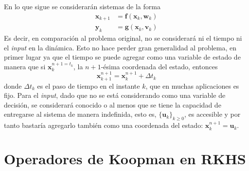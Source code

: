 En lo que sigue se considerarán sistemas de la forma
\begin{align*}
	\mathbf{x}_{k+1} &= \mathbf{f}( \mathbf{x}_k, \mathbf{w}_k) \\
	\mathbf{y}_k &= \mathbf{g}(\mathbf{x}_k, \mathbf{v}_k)
\end{align*}
Es decir, en comparación al problema original, no se considerará ni el tiempo ni el \textit{input} en la dinámica. Esto no hace perder gran generalidad al problema, en primer lugar ya que el tiempo se puede agregar como una variable de estado de manera que si $\mathbf{x}_{k}^{n+1 = t_k}$, la $n+1$-ésima coordenada del estado, entonces 
\begin{equation*}
    \mathbf{x}_{k+1}^{n+1} = \mathbf{x}_{k}^{n+1} + \Delta t_k
\end{equation*}
donde $\Delta t_k$ es el paso de tiempo en el instante $k$, que en muchas aplicaciones es fijo. Para el \textit{input}, dado que no se está considerando como una variable de decisión, se considerará conocido o al menos que se tiene la capacidad de entregarse al sistema de manera indefinida, esto es, $\{ \mathbf{u}_k \}_{k \geq 0}$, es accesible y por tanto bastaría agregarlo también como una coordenada del estado: $\mathbf{x}_{k}^{n+1} = \mathbf{u}_k$.
\section{Operadores de Koopman en RKHS}

